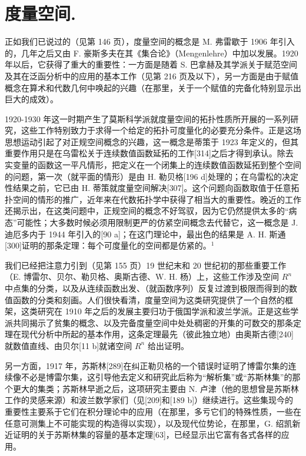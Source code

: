 \chapter{度量空间.}

正如我们已说过的（见第 146 页），度量空间的概念是 M. 弗雷歇于 1906 年引入的，几年之后又由 F. 豪斯多夫在其《集合论》（Mengenlehre）中加以发展。1920 年以后，它获得了重大的重要性：一方面是随着 S. 巴拿赫及其学派关于赋范空间及其在泛函分析中的应用的基本工作（见第 216 页及以下），另一方面是由于赋值概念在算术和代数几何中唤起的兴趣（在那里，关于一个赋值的完备化特别显示出巨大的成效）。

1920-1930 年这一时期产生了莫斯科学派就度量空间的拓扑性质所开展的一系列研究，这些工作特别致力于求得一个给定的拓扑可度量化的必要充分条件。正是这场思想运动引起了对正规空间概念的兴趣，这一概念是蒂策于 1923 年定义的，但其重要作用只是在乌雷松关于连续数值函数延拓的工作{[}314{]}之后才得到承认。除去实变量的函数这一平凡情形，把定义在一个闭集上的连续数值函数延拓到整个空间的问题，第一次（就平面的情形）是由 H. 勒贝格{[}196 d{]}处理的；在乌雷松的决定性结果之前，它已由 H. 蒂策就度量空间解决{[}307{]}。这个问题向函数取值于任意拓扑空间的情形的推广，近年来在代数拓扑学中获得了相当大的重要性。晚近的工作还揭示出，在这类问题中，正规空间的概念不好驾驭，因为它仍然提供太多的“病态”可能性；大多数时候必须用限制更严的仿紧空间概念去代替它，这一概念是 J. 迪厄多内于 1944 年引入的{[}90 a{]}；在这门理论中，最出色的结果是 A. H. 斯通{[}300{]}证明的那条定理：每个可度量化的空间都是仿紧的。\(^{1}\)

我们已经把注意力引到（见第 155 页）19 世纪末和 20 世纪初的那些重要工作（E. 博雷尔、贝尔、勒贝格、奥斯古德、W. H. 杨）上，这些工作涉及空间 \(R^{n}\) 中点集的分类，以及从连续函数出发、（就函数序列）反复过渡到极限而得到的数值函数的分类和刻画。人们很快看清，度量空间为这类研究提供了一个自然的框架，这类研究在 1910 年之后的发展主要归功于俄国学派和波兰学派。正是这些学派共同揭示了贫集的概念、以及完备度量空间中处处稠密的开集的可数交的那条定理在现代分析中所起的基本作用，这条定理最先（彼此独立地）由奥斯古德{[}240{]}就数值直线、由贝尔{[}11 b{]}就诸空间 \(R^{n}\) 给出证明。

另一方面，1917 年，苏斯林{[}289{]}在纠正勒贝格的一个错误时证明了博雷尔集的连续像不必是博雷尔集，这引导他去定义和研究此后称为“解析集”或“苏斯林集”的那个更大的集类；苏斯林早逝之后，这项研究主要由 N. 卢津（他的思想曾是苏斯林工作的灵感来源）和波兰数学家们（见{[}209{]}和{[}189 b{]}）继续进行。这些集现今的重要性主要系于它们在积分理论中的应用（在那里，多亏它们的特殊性质，一些在任意可测集上不可能实现的构造得以实现），以及现代位势论，在那里，G. 绍凯新近证明的关于苏斯林集的容量的基本定理{[}63{]}，已经显示出它富有各式各样的应用。
\relax{}
